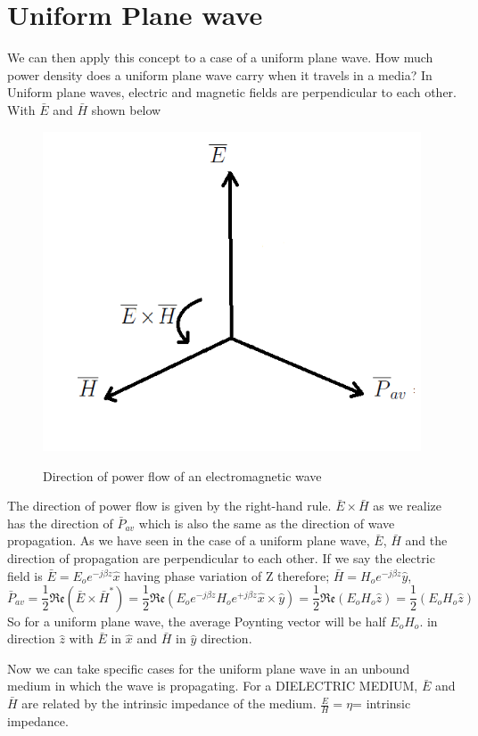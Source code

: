 \section{Uniform Plane wave}
We can then apply this concept to a case of a uniform plane wave. How much power density does a uniform plane wave carry when it travels in a media? In Uniform plane waves, electric and magnetic fields are perpendicular to each other. With $ \bar{E} $ and $ \bar{H} $ shown below
\begin{figure}[h]
\centering
\textsc{\includegraphics[width=.7\linewidth]{./graphics/cc}}
\caption{Direction of power flow of an electromagnetic wave}
\end{figure}

The direction of power flow is given by the right-hand rule. $ \bar{E}\times\bar{H} $ as we realize has the direction of $ \bar{P}_{av} $ which is also the same as the direction of wave propagation. As we have seen in the case of a uniform plane wave, $ \bar{E} $, $ \bar{H} $ and the direction of propagation are perpendicular to each other. If we say the electric field is $ \bar{E}=E_{o}e^{-j\beta z}\hat{x} $ having phase variation of Z therefore;
$ \bar{H}=H_{o}e^{-j\beta z}\hat{y} $,
\begin{dmath*}
\bar{P}_{av}=\frac{1}{2}\mathfrak{Re}(\bar{E}\times\bar{H}^{*})
=\frac{1}{2}\mathfrak{Re}(E_{o}e^{-j\beta z}H_{o}e^{+j\beta z}\hat{x}\times\hat{y})
=\frac{1}{2}\mathfrak{Re}(E_{o}H_{o}\hat{z})=\frac{1}{2}(E_{o}H_{o}\hat{z}) 
\end{dmath*}
So for a uniform plane wave, the average Poynting vector will be half $ E_{o}H_{o} $. in direction $ \hat{z} $ with $ \bar{E} $ in $ \hat{x} $ and $ \bar{H} $ in $ \hat{y} $ direction.

Now we can take specific cases for the uniform plane wave in an unbound medium in which the wave is propagating. For a DIELECTRIC MEDIUM, $ \bar{E} $ and $ \bar{H} $ are related by the intrinsic impedance of the medium.
$ \frac{E}{H}=\eta $= intrinsic impedance.

